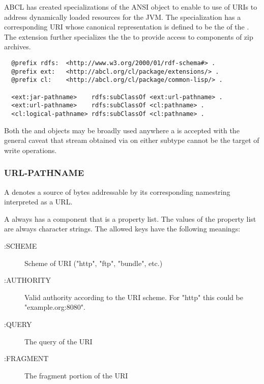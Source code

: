 \documentclass[10pt]{book}
\begin{document}
\textsc{ABCL} has created specializations of the ANSI
 object to enable to use of \textsc{URI}s to address
dynamically loaded resources for the JVM.  The 
specialization has a corresponding \textsc{URI} whose canonical
representation is defined to be the  of the
. The  extension further
specializes the the  to provide access to
components of zip archives.  

\begin{verbatim}
  @prefix rdfs:  <http://www.w3.org/2000/01/rdf-schema#> .
  @prefix ext:   <http://abcl.org/cl/package/extensions/> .
  @prefix cl:    <http://abcl.org/cl/package/common-lisp/> .
  
  <ext:jar-pathname>    rdfs:subClassOf <ext:url-pathname> .
  <ext:url-pathname>    rdfs:subClassOf <cl:pathname> .
  <cl:logical-pathname> rdfs:subClassOf <cl:pathname> .
\end{verbatim}

Both the  and  objects
may be broadly used anywhere a  is accepted with the
general caveat that stream obtained via  on either subtype
cannot be the target of write operations.

\subsubsection{URL-PATHNAME}
\label{EXTENSIONS:URL-PATHNAME}

A  denotes a source of bytes addressable by its
corresponding namestring interpreted as a URL.  

A  always has a  component that is a
property list.  The values of the  property list are always
character strings.  The allowed keys have the following meanings:

\begin{description}
\item[:SCHEME] Scheme of URI ("http", "ftp", "bundle", etc.)
\item[:AUTHORITY] Valid authority according to the URI scheme.  For
  "http" this could be "example.org:8080". 
\item[:QUERY] The query of the \textsc{URI} 
\item[:FRAGMENT] The fragment portion of the \textsc{URI}
\end{description}
\end{document}
